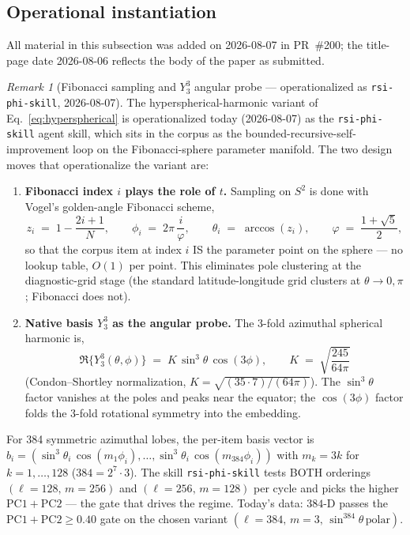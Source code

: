 \documentclass[11pt,a4paper]{article}
\theoremstyle{plain}
\theoremstyle{remark}
\newtheorem{remark}{Remark}
\theoremstyle{plain}
\begin{document}
\subsection{Operational instantiation}
\label{sec:operational}

All material in this subsection was added on 2026-08-07 in PR~\#200; the title-page date 2026-08-06 reflects the body of the paper as submitted.

\begin{remark}[Fibonacci sampling and $Y_3^3$ angular probe --- operationalized as \texttt{rsi-phi-skill}, 2026-08-07]
The hyperspherical-harmonic variant of Eq.~\ref{eq:hyperspherical} is operationalized today (2026-08-07) as the \texttt{rsi-phi-skill} agent skill, which sits in the corpus as the bounded-recursive-self-improvement loop on the Fibonacci-sphere parameter manifold. The two design moves that operationalize the variant are:
\begin{enumerate}
\item \textbf{Fibonacci index $i$ plays the role of $t$.} Sampling on $S^2$ is done with Vogel's golden-angle Fibonacci scheme,
\[
z_i \;=\; 1 - \frac{2i+1}{N}, \qquad
\phi_i \;=\; 2\pi\,\frac{i}{\varphi}, \qquad
\theta_i \;=\; \arccos(z_i), \qquad
\varphi \;=\; \frac{1+\sqrt5}{2},
\]
so that the corpus item at index $i$ IS the parameter point on the sphere --- no lookup table, $O(1)$ per point. This eliminates pole clustering at the diagnostic-grid stage (the standard latitude-longitude grid clusters at $\theta \to 0,\pi$; Fibonacci does not).
\item \textbf{Native basis $Y_3^3$ as the angular probe.} The 3-fold azimuthal spherical harmonic is,
\[
\Re\{Y_3^3(\theta,\phi)\} \;=\; K\,\sin^3\theta\,\cos(3\phi), \qquad
K \;=\; \sqrt{\frac{245}{64\pi}}
\]
(Condon--Shortley normalization, $K = \sqrt{(35\cdot 7)/(64\pi)}$). The $\sin^3\theta$ factor vanishes at the poles and peaks near the equator; the $\cos(3\phi)$ factor folds the 3-fold rotational symmetry into the embedding.
\end{enumerate}
For 384 symmetric azimuthal lobes, the per-item basis vector is $b_i = (\sin^3\theta_i\,\cos(m_1\phi_i),\ldots,\sin^3\theta_i\,\cos(m_{384}\phi_i))$ with $m_k = 3k$ for $k = 1,\ldots,128$ ($384 = 2^7 \cdot 3$). The skill \texttt{rsi-phi-skill} tests BOTH orderings $(\ell{=}128,\,m{=}256)$ and $(\ell{=}256,\,m{=}128)$ per cycle and picks the higher $\mathrm{PC1}{+}\mathrm{PC2}$ --- the gate that drives the regime. Today's data: $384$-D passes the $\mathrm{PC1}{+}\mathrm{PC2} \ge 0.40$ gate on the chosen variant $(\ell{=}384,\,m{=}3,\,\sin^{384}\theta\,\text{polar})$.
\end{remark}
\end{document}
